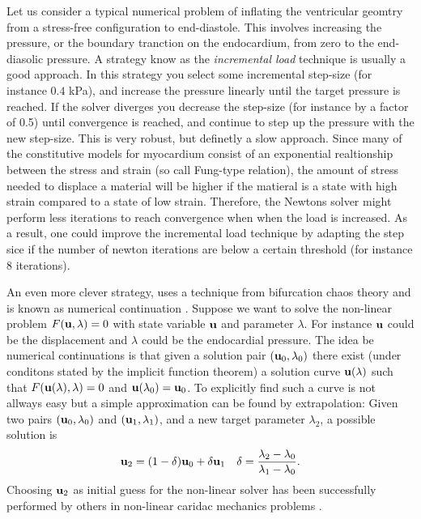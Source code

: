 Let us consider a
typical numerical problem of inflating the ventricular geomtry from a
stress-free configuration to end-diastole. This involves increasing
the pressure, or the boundary tranction on the endocardium, from zero
to the end-diasolic pressure. A strategy know as the
\emph{incremental load} technique is usually a good approach. In this
strategy you select some incremental step-size (for instance $0.4$
kPa), and increase the pressure linearly until the target pressure is
reached. If the solver diverges you decrease the step-size (for
instance by a factor of 0.5) until convergence is reached, and
continue to step up the pressure with the new step-size. This is very
robust, but definetly a slow approach. Since many of the 
constitutive models for myocardium consist of an exponential
realtionship between the stress and strain (so call Fung-type
relation), the amount of stress needed to displace a material will be
higher if the matieral is a state with high strain compared to a state
of low strain. Therefore, the Newtons solver might perform less
iterations to reach convergence when when the load is increased. As a
result, one could improve the incremental load technique by adapting
the step sice if the number of newton iterations are below a certain
threshold (for instance $8$ iterations).

An even more clever strategy, uses a technique from bifurcation
chaos theory and is known as numerical continuation
\cite{allgower2003introduction}.  Suppose we want to
solve the non-linear problem $F(\mathbf{u}, \lambda)=0$ with state variable
$\mathbf{u}$ and parameter $\lambda$. For instance $\mathbf{u}$ could be the
displacement and $\lambda$ could be the endocardial pressure.
The idea be numerical continuations is that given a solution pair
$(\mathbf{u}_0, \lambda_0)$ there exist (under conditons stated by the
implicit function theorem) a solution curve $\mathbf{u}(\lambda)$ such that
$F(\mathbf{u}(\lambda), \lambda)=0$ and $\mathbf{u}(\lambda_0) = \mathbf{u}_0$.
To explicitly find such a curve is not allways easy but a simple
approximation can be found by extrapolation: Given two pairs
$(\mathbf{u}_0, \lambda_0)$ and $(\mathbf{u}_1, \lambda_1)$, and a new target
parameter $\lambda_2$, a possible solution is 
\begin{align}
  \mathbf{u}_2 =  (1-\delta)\mathbf{u}_0 + \delta \mathbf{u}_1 && \delta = \frac{\lambda_2 - \lambda_0}{\lambda_1 - \lambda_0}.
\end{align}
Choosing $\mathbf{u}_2$ as initial guess for the non-linear solver has been
successfully performed by others in non-linear caridac mechanics
problems \cite{pezzuto2013mechanics}. 


